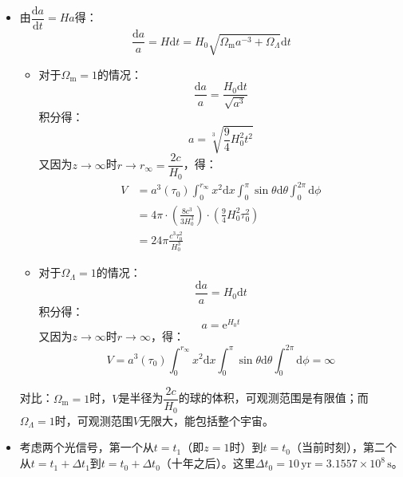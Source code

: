 \documentclass[a4paper,fontset=none]{ctexart}
\begin{document}
\begin{itemize}
    \item[1.(b)]
    由$\dfrac{\mathrm{d}a}{\mathrm{d}t}=Ha$得：
    \[
    \frac{\mathrm{d}a}{a} = H\mathrm{d}t = H_0\sqrt{\Omega_\mathrm{m}a^{-3}+\Omega_\Lambda}\mathrm{d}t
    \]

    \begin{itemize}
        \item[$\bullet$] 对于$\Omega_\mathrm{m}=1$的情况：
        \[
        \frac{\mathrm{d}a}{a} = \frac{H_0\mathrm{d}t}{\sqrt{a^3}}
        \]
        积分得：
        \[
        a = \sqrt[3]{\frac{9}{4}H_0^2t^2}
        \]
        又因为$z\to\infty$时$r\to r_\infty=\dfrac{2c}{H_0}$，得：
        \begin{align*}
            V
            &= a^3(\tau_0)\int_0^{r_\infty}x^2\mathrm{d}x\int_0^\pi\sin\theta\mathrm{d}\theta\int_0^{2\pi}\mathrm{d}\phi \\
            &= 4\pi\cdot\left(\frac{8c^3}{3H_0^3}\right)\cdot\left(\frac{9}{4}H_0^2\tau_0^2\right) \\
            &= 24\pi\frac{c^3\tau_0^2}{H_0^3}
        \end{align*}

        \item[$\bullet$] 对于$\Omega_\Lambda=1$的情况：
        \[
        \frac{\mathrm{d}a}{a} = H_0\mathrm{d}t
        \]
        积分得：
        \[
        a = \mathrm{e}^{H_0 t}
        \]
        又因为$z\to\infty$时$r\to \infty$，得：
        \[
        V = a^3(\tau_0)\int_0^{r_\infty}x^2\mathrm{d}x\int_0^\pi\sin\theta\mathrm{d}\theta\int_0^{2\pi}\mathrm{d}\phi = \infty
        \]
    \end{itemize}
    
    对比：$\Omega_\mathrm{m}=1$时，$V$是半径为$\dfrac{2c}{H_0}$的球的体积，可观测范围是有限值；而$\Omega_\Lambda=1$时，可观测范围$V$无限大，能包括整个宇宙。

    \item[2.] 考虑两个光信号，第一个从$t=t_1$（即$z=1$时）到$t=t_0$（当前时刻），第二个从$t=t_1+\Delta t_1$到$t=t_0+\Delta t_0$（十年之后）。这里$\Delta t_0=10\,\mathrm{yr}=3.1557\times10^8\,\mathrm{s}$。
    

\end{itemize}
\end{document}
